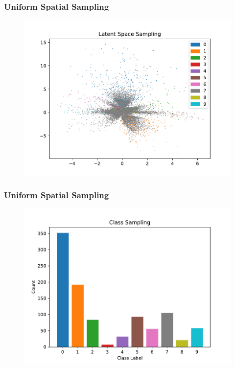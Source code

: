 \documentclass[10pt, usenames, dvipsnames, table]{beamer}
\begin{document}
\begin{frame}
  \frametitle{Uniform Spatial Sampling}
  \begin{figure}
    \centering
    \includegraphics[width=\linewidth]
    {models/mnist_conv_e300_L2_b64/uniform_sampling_1000}
    \caption{}
    \label{fig:conv-uniform}
  \end{figure}
\end{frame}

\begin{frame}
  \frametitle{Uniform Spatial Sampling}
  \begin{figure}
    \centering
    \includegraphics[width=\linewidth]
    {models/mnist_conv_e300_L2_b64/uniform_sampling_distribution_1000}
    \caption{}
    \label{fig:conv-uniform}
  \end{figure}
\end{frame}
\end{document}
